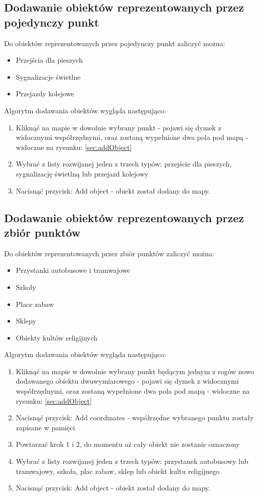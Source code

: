 \newpage
\subsection{Dodawanie obiektów reprezentowanych przez pojedynczy punkt}
Do obiektów reprezentowanych przez pojedynczy punkt zaliczyć można:
\begin{itemize}
\item Przejścia dla pieszych
\item Sygnalizacje świetlne
\item Przejazdy kolejowe
\end{itemize}

Algorytm dodawania obiektów wygląda następująco:
\begin{enumerate}
\item Kliknąć na mapie w dowolnie wybrany punkt - pojawi się dymek z widocznymi współrzędnymi, oraz zostaną wypełnione dwa pola pod mapą - widoczne na rysunku: \ref{sec:addObject}
\item Wybrać z listy rozwijanej jeden z trzech typów: przejście dla pieszych, sygnalizację świetlną lub przejazd kolejowy
\item Nacisnąć przycisk: Add object - obiekt został dodany do mapy.
\end{enumerate} 

\subsection{Dodawanie obiektów reprezentowanych przez zbiór punktów}
Do obiektów reprezentowanych przez zbiór punktów zaliczyć można:
\begin{itemize}
\item Przystanki autobusowe i tramwajowe
\item Szkoły
\item Place zabaw
\item Sklepy
\item Obiekty kultów religijnych
\end{itemize}

Algorytm dodawania obiektów wygląda następująco:
\begin{enumerate}
\item Kliknąć na mapie w dowolnie wybrany punkt będącym jednym z rogów nowo dodawanego obiektu dwuwymiarowego - pojawi się dymek z widocznymi współrzędnymi, oraz zostaną wypełnione dwa pola pod mapą - widoczne na rysunku: \ref{sec:addObject}
\item Nacisnąć przycisk: Add coordinates - współrzędne wybranego punktu zostały zapisane w pamięci
\item Powtarzać krok 1 i 2, do momentu aż cały obiekt nie zostanie oznaczony
\item Wybrać z listy rozwijanej jeden z trzech typów: przystanek autobusowy lub tramwajowy, szkoła, plac zabaw, sklep lub obiekt kultu religijnego
\item Nacisnąć przycisk: Add object - obiekt został dodany do mapy.
\end{enumerate} 